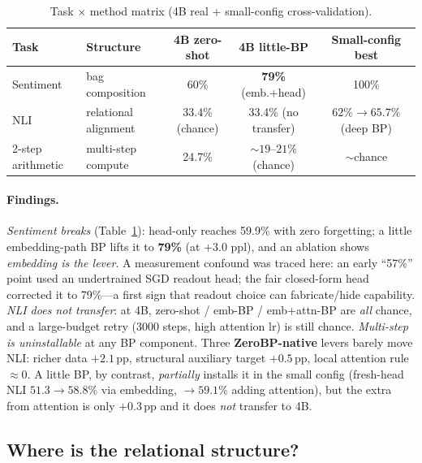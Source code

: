 \documentclass[11pt]{article}
\begin{document}
\begin{table}[t]
\centering
\begin{tabular}{@{}llccc@{}}
\toprule
Task & Structure & 4B zero-shot & 4B little-BP & Small-config best \\
\midrule
Sentiment & bag composition & 60\% & \textbf{79\%} (emb.+head) & 100\% \\
NLI & relational alignment & 33.4\% (chance) & 33.4\% (no transfer) & $62\% \to 65.7\%$ (deep BP) \\
2-step arithmetic & multi-step compute & 24.7\% & ${\sim}19\text{--}21\%$ (chance) & ${\sim}$chance \\
\bottomrule
\end{tabular}
\caption{Task $\times$ method matrix (4B real + small-config cross-validation).}
\label{tab:matrix}
\end{table}

\paragraph{Findings.} \emph{Sentiment breaks} (Table~\ref{tab:matrix}): head-only reaches 59.9\% with zero
forgetting; a little embedding-path BP lifts it to \textbf{79\%} (at $+3.0$ ppl), and an ablation shows
\emph{embedding is the lever}. A measurement confound was traced here: an early ``57\%'' point used an
undertrained SGD readout head; the fair closed-form head corrected it to 79\%---a first sign that readout
choice can fabricate/hide capability. \emph{NLI does not transfer}: at 4B, zero-shot / emb-BP / emb+attn-BP
are \emph{all} chance, and a large-budget retry (3000 steps, high attention lr) is still chance.
\emph{Multi-step is uninstallable} at any BP component. Three \textbf{ZeroBP-native} levers barely move NLI:
richer data $+2.1$\,pp, structural auxiliary target $+0.5$\,pp, local attention rule $\approx 0$. A little
BP, by contrast, \emph{partially} installs it in the small config (fresh-head NLI $51.3 \to 58.8\%$ via
embedding, $\to 59.1\%$ adding attention), but the extra from attention is only $+0.3$\,pp and it does
\emph{not} transfer to 4B.

\subsection{Where is the relational structure?}
\label{sec:probes}
\end{document}
